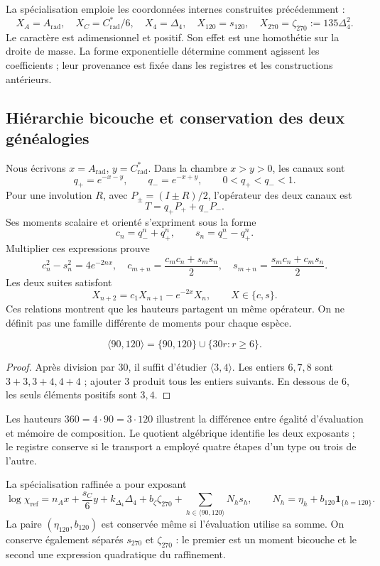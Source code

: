 La spécialisation emploie les coordonnées internes construites précédemment :
\[
 X_A=A_{\mathrm{rad}},\quad X_C=C^*_{\mathrm{rad}}/6,
 \quad X_4=\Delta_4,\quad X_{120}=s_{120},\quad
 X_{270}=\zeta_{270}:=135\Delta_4^2.
\]
Le caractère est adimensionnel et positif. Son effet est une homothétie sur
la droite de masse. La forme exponentielle détermine comment agissent les
coefficients ; leur provenance est fixée dans les registres et les constructions
antérieurs.

\subsection{Hiérarchie bicouche et conservation des deux généalogies}

Nous écrivons \(x=A_{\mathrm{rad}}\), \(y=C^*_{\mathrm{rad}}\). Dans la
chambre \(x>y>0\), les canaux sont
\[
 q_+=e^{-x-y},\qquad q_-=e^{-x+y},\qquad0<q_+<q_-<1.
\]
Pour une involution \(R\), avec \(P_\pm=(I\pm R)/2\), l’opérateur
des deux canaux est
\[
 T=q_+P_++q_-P_-.
\]
Ses moments scalaire et orienté s’expriment sous la forme
\[
 c_n=q_-^n+q_+^n,\qquad s_n=q_-^n-q_+^n.
\]
Multiplier ces expressions prouve
\[
 c_n^2-s_n^2=4e^{-2nx},\quad
 c_{m+n}=\frac{c_mc_n+s_ms_n}{2},\quad
 s_{m+n}=\frac{s_mc_n+c_ms_n}{2}.
\]
Les deux suites satisfont
\[
 X_{n+2}=c_1X_{n+1}-e^{-2x}X_n,\qquad X\in\{c,s\}.
\]
Ces relations montrent que les hauteurs partagent un même opérateur.
On ne définit pas une famille différente de moments pour chaque espèce.

\begin{proposition}
\[
 \langle90,120\rangle=\{90,120\}\cup\{30r:r\ge6\}.
\]
\end{proposition}
\begin{proof}
Après division par \(30\), il suffit d’étudier \(\langle3,4\rangle\).
Les entiers \(6,7,8\) sont \(3+3,3+4,4+4\) ; ajouter \(3\) produit
tous les entiers suivants. En dessous de \(6\), les seuls
éléments positifs sont \(3,4\).
\end{proof}

Les hauteurs \(360=4\cdot90=3\cdot120\) illustrent la différence entre
égalité d’évaluation et mémoire de composition. Le quotient algébrique
identifie les deux exposants ; le registre conserve si le transport
a employé quatre étapes d’un type ou trois de l’autre.

La spécialisation raffinée a pour exposant
\[
 \log\chi_{\mathrm{ref}}=n_Ax+\frac{s_C}{6}y+k_{\Delta_4}\Delta_4
 +b_{\zeta}\zeta_{270}+\sum_{h\in\langle90,120\rangle}N_hs_h,
 \qquad N_h=\eta_h+b_{120}\mathbf1_{\{h=120\}}.
\]
La paire \((\eta_{120},b_{120})\) est conservée même si l’évaluation utilise
sa somme. On conserve également séparés \(s_{270}\) et
\(\zeta_{270}\) : le premier est un moment bicouche et le second une
expression quadratique du raffinement.

